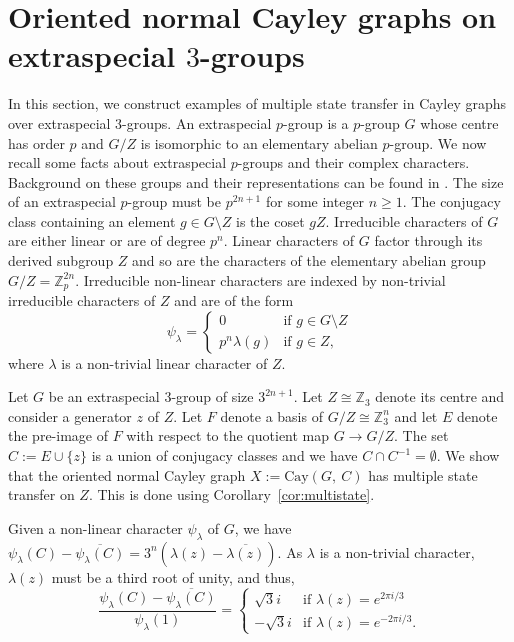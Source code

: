 \documentclass{amsart}
\theoremstyle{plain}
\theoremstyle{remark}\newtheorem{con}[theorem]{Construction}
\theoremstyle{remark} \newtheorem*{remark}{Remark}
\theoremstyle{remark} \newtheorem{example}{Example}
\newcommand{\bb}{\mathbb}
\newcommand{\mrm}{\mathrm}
\newcommand{\ov}{\overline}
\begin{document}
\section{Oriented normal Cayley graphs on extraspecial $3$-groups}\label{sec:extraspecial}
In this section, we construct examples of multiple state transfer in Cayley graphs over extraspecial $3$-groups. An extraspecial $p$-group is a $p$-group $G$ whose centre has order $p$ and $G/Z$ is isomorphic to an elementary abelian $p$-group. We now recall some facts about extraspecial $p$-groups and their complex characters. Background on these groups and their representations can be found in  \cite[\S~5.5]{gorenstein2007finite}. The size of an extraspecial $p$-group must be $p^{2n+1}$ for some integer $n\geq 1$. The conjugacy class containing an element $g \in G \setminus Z$ is the coset $gZ$. Irreducible characters of $G$ are either linear or are of degree $p^{n}$. Linear characters of $G$ factor through its derived subgroup $Z$ and so are the characters of the elementary abelian group $G/Z= \bb{Z}_{p}^{2n}$. Irreducible non-linear characters are indexed by non-trivial irreducible characters of $Z$ and are of the form 
\[\psi_{\lambda} = \begin{cases}
0 & \text{if $g \in G\setminus Z$} \\
p^{n}\lambda(g) & \text{if $g \in Z$},
\end{cases}
\] 
where $\lambda$ is a non-trivial linear character of $Z$.


Let $G$ be an extraspecial $3$-group of size $3^{2n+1}$. Let $Z\cong \bb{Z}_{3}$ denote its centre and consider a generator $z$ of $Z$. Let $F$ denote a basis of $G/Z \cong \bb{Z}_{3}^{n}$ and let $E$ denote the pre-image of $F$ with respect to the quotient map $G \to G/Z$. The set $C:=E \cup \{z\}$ is a union of conjugacy classes and we have $C \cap C^{-1}=\emptyset$. We show that the oriented normal Cayley graph $X := \mrm{Cay}(G,\ C)$ has multiple state transfer on $Z$. This is done using Corollary~\ref{cor:multistate}.


Given a non-linear character $\psi_{\lambda}$ of $G$, we have $\psi_{\lambda}(C)-\ov{\psi_{\lambda}(C)}=3^{n} (\lambda(z)- \ov{\lambda(z)})$. As $\lambda$ is a non-trivial character, $\lambda(z)$ must be a third root of unity, and thus, \[\dfrac{\psi_{\lambda}(C)-\ov{\psi_{\lambda}(C)}}{\psi_{\lambda}(1)}= \begin{cases} \sqrt{3}i\ &\text{if $\lambda(z)= e^{2\pi i/3}$}\\
-\sqrt{3}i &\text{if $\lambda(z)= e^{-2\pi i/3}$}.
\end{cases}\]
\end{document}
